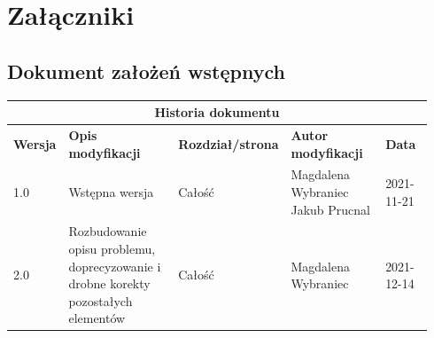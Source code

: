 \documentclass{sprz}
\begin{document}
\chapter{Załączniki}

\section{Dokument założeń wstępnych}

\begin{documenttable}[]
\end{documenttable}
\begin{center}
  \begin{tabular}{ |p{0.1\linewidth}|p{0.28\linewidth}|p{0.2\linewidth}|p{0.24\linewidth}|p{0.12\linewidth}| }
    \hline
    \multicolumn{5}{|c|}{\textbf{Historia dokumentu}} \\
    \hline
    \textbf{Wersja} & \textbf{Opis modyfikacji} & \textbf{Rozdział/strona} & \textbf{Autor modyfikacji} & \textbf{Data}\\
    \hline
    {1.0} & {Wstępna wersja} & {Całość} & {Magdalena Wybraniec \newline Jakub Prucnal} & {2021-11-21}\\
    \hline
    {2.0} & {Rozbudowanie opisu problemu, doprecyzowanie i drobne korekty pozostałych elementów} &
    {Całość} & {Magdalena Wybraniec} & {2021-12-14}\\
    \hline
  \end{tabular}
\end{center}
\end{document}
